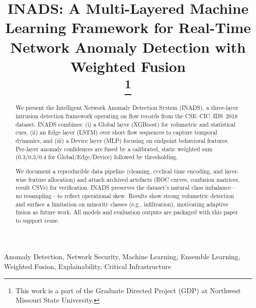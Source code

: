 \documentclass[conference]{IEEEtran}
\begin{document}
\title{INADS: A Multi-Layered Machine Learning Framework for Real-Time Network Anomaly Detection with Weighted Fusion\\ \thanks{This work is a part of the Graduate Directed Project (GDP) at Northwest Missouri State University.} }

\author{
\and
{}
}

\maketitle

\begin{abstract}
We present the Intelligent Network Anomaly Detection System (INADS), a three-layer intrusion detection framework operating on flow records from the CSE--CIC--IDS~2018 dataset. INADS combines: (i) a Global layer (XGBoost) for volumetric and statistical cues, (ii) an Edge layer (LSTM) over short flow sequences to capture temporal dynamics, and (iii) a Device layer (MLP) focusing on endpoint behavioral features. Per-layer anomaly confidences are fused by a calibrated, static weighted sum (0.3/0.3/0.4 for Global/Edge/Device) followed by thresholding.

We document a reproducible data pipeline (cleaning, cyclical time encoding, and layer-wise feature allocation) and attach archived artefacts (ROC curves, confusion matrices, result CSVs) for verification. INADS preserves the dataset's natural class imbalance—no resampling—to reflect operational skew. Results show strong volumetric detection and surface a limitation on minority classes (e.g., infiltration), motivating adaptive fusion as future work. All models and evaluation outputs are packaged with this paper to support reuse.
\end{abstract}


\begin{IEEEkeywords}
Anomaly Detection, Network Security, Machine Learning, Ensemble Learning, Weighted Fusion, Explainability, Critical Infrastructure
\end{IEEEkeywords}
\end{document}
